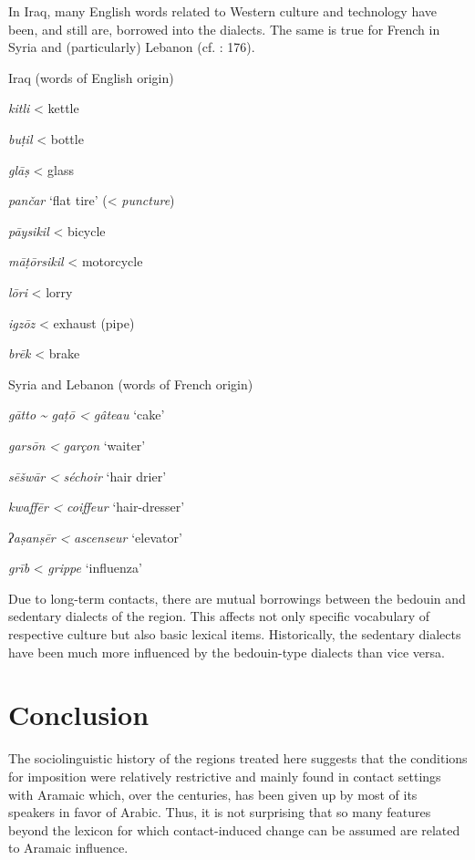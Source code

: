 \documentclass[output=paper]{langsci/langscibook}
\begin{document}
In Iraq, many English words related to Western culture and technology have been, and still are, borrowed into the dialects. The same is true for French in Syria and (particularly) Lebanon (cf. \citealt{Barbot1961}: 176).

\ea
Iraq (words of English origin)

\textit{kitli} < kettle 

\textit{buṭil} < bottle

\textit{glāṣ} < glass

\textit{pančar} ‘flat tire’ (< \textit{puncture})

\textit{pāysikil} < bicycle

\textit{māṭōrsikil} < motorcycle

\textit{lōri} < lorry 

\textit{igzōz} < exhaust (pipe)

\textit{brēk} < brake
\z

\ea
Syria and Lebanon (words of French origin)

\textit{gātto} \textit{{\textasciitilde} gaṭō < gâteau} ‘cake’

\textit{garsōn} \textit{<} \textit{garçon} ‘waiter’

\textit{sēšwār} \textit{<} \textit{séchoir} ‘hair drier’

\textit{kwaffēr} \textit{<} \textit{coiffeur} ‘hair-dresser’

\textit{ʔaṣanṣēr} \textit{<} \textit{ascenseur} ‘elevator’

\textit{grīb} < \textit{grippe} ‘influenza’
\z

Due to long-term contacts, there are mutual borrowings between the bedouin and sedentary dialects of the region. This affects not only specific vocabulary of respective culture but also basic lexical items. Historically, the sedentary dialects have been much more influenced by the bedouin-type dialects than vice versa. 

\section{Conclusion} 

The sociolinguistic history of the regions treated here suggests that the conditions for imposition were relatively restrictive and mainly found in contact settings with Aramaic which, over the centuries, has been given up by most of its speakers in favor of Arabic. Thus, it is not surprising that so many features beyond the lexicon for which contact-induced change can be assumed are related to Aramaic influence. 
\end{document}
